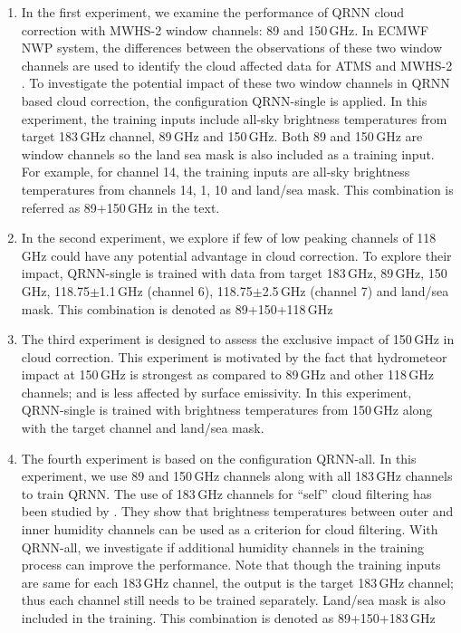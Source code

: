 \documentclass[amt, manuscript]{copernicus}
\begin{document}
\begin{enumerate}
	
	\item In the first experiment, we examine the performance of QRNN cloud correction with MWHS-2 window channels: 89 and 150\,GHz. In ECMWF NWP system, the differences between the observations of these two window channels are used to identify the cloud affected data for ATMS and MWHS-2 \citep{geer2015scatteringindex}. To investigate the potential impact of these two window channels in QRNN based cloud correction, the configuration QRNN-single is applied. In this experiment, the training inputs include all-sky brightness temperatures from target 183\,GHz channel, 89\,GHz and 150\,GHz. Both 89 and 150\,GHz are window channels so the land sea mask is also included as a training input. For example, for channel 14, the training inputs are all-sky brightness temperatures from channels 14, 1, 10 and land/sea mask. This combination is referred as 89+150\,GHz in the text.
	
	\item In the second experiment, we explore if few of low peaking channels of 118\,GHz could have any potential advantage in cloud correction. To explore their impact, QRNN-single is trained with data from target 183\,GHz, 89\,GHz, 150\,GHz, 118.75$\pm$1.1\,GHz (channel 6), 118.75$\pm$2.5\,GHz (channel 7) and land/sea mask. This combination is denoted as 89+150+118\,GHz
	
	\item The third experiment is designed to assess the exclusive impact of 150\,GHz in cloud correction. This experiment is motivated by the fact that hydrometeor impact at 150\,GHz is strongest as compared to 89\,GHz and other 118\,GHz channels; and is less affected by surface emissivity. In this experiment, QRNN-single is trained with brightness temperatures from 150\,GHz along with the target channel and land/sea mask. 
	
	\item The fourth experiment is based on the configuration QRNN-all. In this experiment, we use 89 and 150\,GHz channels along with all 183\,GHz channels to train QRNN. The use of 183\,GHz channels for ``self'' cloud filtering has been studied by  \citet{buehler:aclou:07}. They show that brightness temperatures between outer and inner humidity channels can be used as a criterion for cloud filtering. With QRNN-all, we investigate if additional humidity channels in the training process can improve the performance. Note that though the training inputs are same for each 183\,GHz channel, the output is the target 183\,GHz channel; thus each channel still needs to be trained separately. Land/sea mask is also included in the training. This combination is denoted as 89+150+183\,GHz
\end{enumerate}
\end{document}
